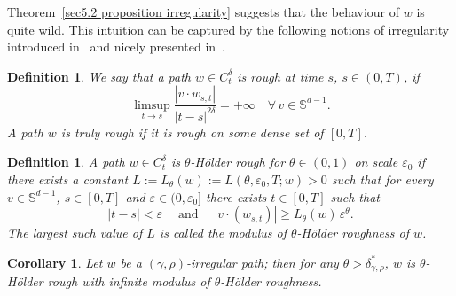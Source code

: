 \documentclass[10pt]{article}
\newcommand{\assign}{:=}
\newcommand{\tmop}[1]{\ensuremath{\operatorname{#1}}}
\newtheorem{corollary}[theorem]{Corollary}
\newtheorem{definition}[theorem]{Definition}
\begin{document}
Theorem~\ref{sec5.2 proposition irregularity} suggests that the behaviour of
$w$ is quite wild. This intuition can be captured by the following notions of
irregularity introduced in~{\cite{frizdoobmeyer}} and nicely presented
in~{\cite{frizhairer}}.

\begin{definition}
  We say that a path $w \in C^{\delta}_t$ is rough at time $s$, $s \in (0,
  T)$, if
  \[ \limsup_{t \rightarrow s} \frac{| v \cdot w_{s, t} |}{| t - s |^{2
     \delta}} = + \infty \quad \forall \, v \in \mathbb{S}^{d - 1} . \]
  A path $w$ is truly rough if it is rough on some dense set of $[0, T]$.
\end{definition}

\begin{definition}
  A path $w \in C^{\delta}_t$ is $\theta$-H{\"o}lder rough for $\theta \in (0,
  1)$ on scale $\varepsilon_0$ if there exists a constant $L \assign
  L_{\theta} (w) \assign L (\theta, \varepsilon_0, T ; w) > 0$ such that for
  every $v \in \mathbb{S}^{d - 1}$, $s \in [0, T]$ and $\varepsilon \in (0,
  \varepsilon_0]$ there exists $t \in [0, T]$ such that
  \begin{equation}
    | t - s | < \varepsilon \quad \tmop{and} \quad | v \cdot (w_{s, t}) |
    \geqslant L_{\theta} (w) \, \varepsilon^{\theta} .
  \end{equation}
  The largest such value of $L$ is called the modulus of $\theta$-H{\"o}lder
  roughness of $w$. 
\end{definition}

\begin{corollary}
  Let $w$ be a $(\gamma, \rho)$-irregular path; then for any $\theta >
  \delta^{\ast}_{\gamma, \rho}$, $w$ is $\theta$-H{\"o}lder rough with
  infinite modulus of $\theta$-H{\"o}lder roughness.
\end{corollary}
\end{document}

